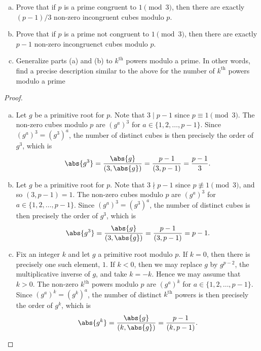 \documentclass[10pt]{amsart}
\begin{document}
\begin{thm}\label{ex2}
  \begin{enumerate}[(a)]
  \item
    Prove that if $p$ is a prime congruent to $1 \pmod{3}$, then there are exactly $(p-1)/3$ non-zero incongruent cubes modulo $p$.
  \item
    Prove that if $p$ is a prime not congruent to $1 \pmod{3}$, then there are exactly $p-1$ non-zero incongruenct cubes modulo $p$.
  \item
    Generalize parts (a) and (b) to $k^\text{th}$ powers modulo a prime.
    In other words, find a precise description similar to the above for the number of $k^\text{th}$ powers modulo a prime
  \end{enumerate}
  
  \begin{proof}
    \begin{enumerate}[(a)]
    \item
      Let $g$ be a primitive root for $p$.
      Note that $3 \mid p-1$ since $p \equiv 1 \pmod{3}$.
      The non-zero cubes modulo $p$ are $(g^a)^3$ for $a \in \{1, 2, \ldots, p-1\}$.
      Since $(g^a)^3 = (g^3)^a$, the number of distinct cubes is then precisely the order of $g^3$, which is 
      $$\abs{g^3} = \frac{\abs{g}}{(3,\abs{g})} = \frac{p-1}{(3, p-1)} = \frac{p-1}{3}.$$
    \item
      Let $g$ be a primitive root for $p$.
      Note that $3 \nmid p-1$ since $p \not \equiv 1 \pmod{3}$, and so $(3, p-1) = 1$.
      The non-zero cubes modulo $p$ are $(g^a)^3$ for $a \in \{1, 2, \ldots, p-1\}$.
      Since $(g^a)^3 = (g^3)^a$, the number of distinct cubes is then precisely the order of $g^3$, which is 
      $$\abs{g^3} = \frac{\abs{g}}{(3,\abs{g})} = \frac{p-1}{(3,p-1)} = p-1.$$
    \item
      Fix an integer $k$ and let $g$ a primitive root modulo $p$.
      If $k = 0$, then there is precisely one such element, $1$.
      If $k < 0$, then we may replace $g$ by $g^{p-2}$, the multiplicative inverse of $g$, and take $k = -k$.
      Hence we may assume that $k > 0$.
      The non-zero $k^\text{th}$ powers modulo $p$ are $(g^a)^k$ for $a \in \{1, 2, \ldots, p-1\}$.
      Since $(g^a)^k = (g^k)^a$, the number of distinct $k^\text{th}$ powers is then precisely the order of $g^k$, which is 
      $$\abs{g^k} = \frac{\abs{g}}{(k,\abs{g})} = \frac{p-1}{(k,p-1)}.$$
    \end{enumerate}
  \end{proof}
\end{thm}
\end{document}
